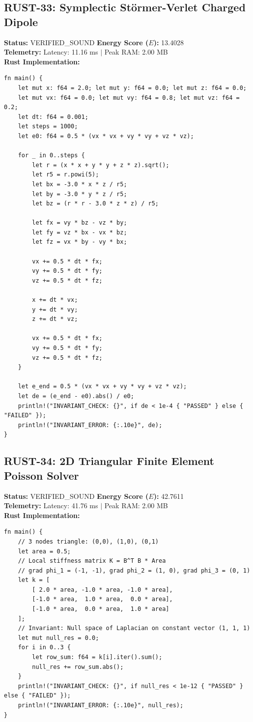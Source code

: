 \documentclass[11pt, a4paper]{article}
\begin{document}
\subsection{RUST-33: Symplectic Störmer-Verlet Charged Dipole}
\textbf{Status:} VERIFIED\_SOUND \hfill \textbf{Energy Score ($E$):} 13.4028\\
\textbf{Telemetry:} Latency: 11.16 ms $|$ Peak RAM: 2.00 MB\\
\textbf{Rust Implementation:}
\begin{verbatim}
fn main() {
    let mut x: f64 = 2.0; let mut y: f64 = 0.0; let mut z: f64 = 0.0;
    let mut vx: f64 = 0.0; let mut vy: f64 = 0.8; let mut vz: f64 = 0.2;
    let dt: f64 = 0.001;
    let steps = 1000;
    let e0: f64 = 0.5 * (vx * vx + vy * vy + vz * vz);
    
    for _ in 0..steps {
        let r = (x * x + y * y + z * z).sqrt();
        let r5 = r.powi(5);
        let bx = -3.0 * x * z / r5;
        let by = -3.0 * y * z / r5;
        let bz = (r * r - 3.0 * z * z) / r5;
        
        let fx = vy * bz - vz * by;
        let fy = vz * bx - vx * bz;
        let fz = vx * by - vy * bx;
        
        vx += 0.5 * dt * fx;
        vy += 0.5 * dt * fy;
        vz += 0.5 * dt * fz;
        
        x += dt * vx;
        y += dt * vy;
        z += dt * vz;
        
        vx += 0.5 * dt * fx;
        vy += 0.5 * dt * fy;
        vz += 0.5 * dt * fz;
    }
    
    let e_end = 0.5 * (vx * vx + vy * vy + vz * vz);
    let de = (e_end - e0).abs() / e0;
    println!("INVARIANT_CHECK: {}", if de < 1e-4 { "PASSED" } else { "FAILED" });
    println!("INVARIANT_ERROR: {:.10e}", de);
}
\end{verbatim}

\subsection{RUST-34: 2D Triangular Finite Element Poisson Solver}
\textbf{Status:} VERIFIED\_SOUND \hfill \textbf{Energy Score ($E$):} 42.7611\\
\textbf{Telemetry:} Latency: 41.76 ms $|$ Peak RAM: 2.00 MB\\
\textbf{Rust Implementation:}
\begin{verbatim}
fn main() {
    // 3 nodes triangle: (0,0), (1,0), (0,1)
    let area = 0.5;
    // Local stiffness matrix K = B^T B * Area
    // grad phi_1 = (-1, -1), grad phi_2 = (1, 0), grad phi_3 = (0, 1)
    let k = [
        [ 2.0 * area, -1.0 * area, -1.0 * area],
        [-1.0 * area,  1.0 * area,  0.0 * area],
        [-1.0 * area,  0.0 * area,  1.0 * area]
    ];
    // Invariant: Null space of Laplacian on constant vector (1, 1, 1)
    let mut null_res = 0.0;
    for i in 0..3 {
        let row_sum: f64 = k[i].iter().sum();
        null_res += row_sum.abs();
    }
    println!("INVARIANT_CHECK: {}", if null_res < 1e-12 { "PASSED" } else { "FAILED" });
    println!("INVARIANT_ERROR: {:.10e}", null_res);
}
\end{verbatim}
\end{document}
